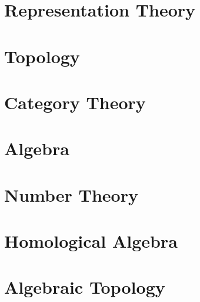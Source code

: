 \documentclass{report}
\begin{document}
\chapter{Representation Theory}
\renewcommand{\cat}{RT}


\chapter{Topology}
\renewcommand{\cat}{TO}


\chapter{Category Theory}
\renewcommand{\cat}{CT}






\chapter{Algebra}
\renewcommand{\cat}{AA}











\chapter{Number Theory}
\renewcommand{\cat}{NT}




\chapter{Homological Algebra}
\renewcommand{\cat}{HA}




\chapter{Algebraic Topology}
\renewcommand{\cat}{AT}

\end{document}
